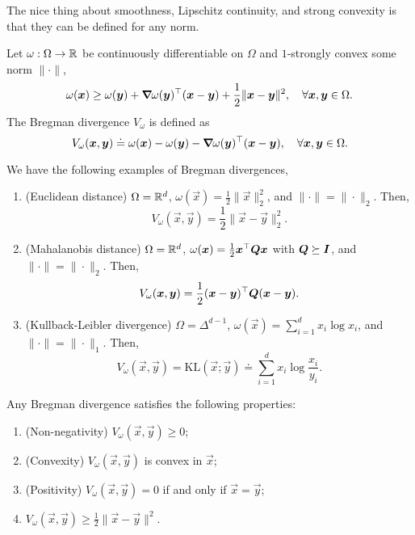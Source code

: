 The nice thing about smoothness, Lipschitz continuity, and strong convexity is that they can be
defined for any norm.

\begin{definition}
    Let $\omega: \Omega \to \mathbb{R}$ be continuously differentiable on $\Omega$ and $1$-strongly
    convex \wrt some norm $\| \cdot \|$, \[
        \omega(\bm{x}) \geq \omega(\bm{y}) + \bm{\nabla}_{\! } \omega(\bm{y})^\top(\bm{x} - \bm{y}) + \frac{1}{2} \| \bm{x} - \bm{y} \|^2, \quad \forall \bm{x},\bm{y} \in \Omega.
    \]
    The Bregman divergence $V_{\omega}$ is defined as \[
        V_{\omega}(\bm{x}, \bm{y}) \doteq \omega(\bm{x}) - \omega(\bm{y}) - \bm{\nabla}_{\! } \omega(\bm{y})^\top(\bm{x} - \bm{y}), \quad \forall \bm{x}, \bm{y} \in \Omega.
    \]
\end{definition}

\begin{example}
    \label{ex:bregman}
    We have the following examples of Bregman divergences,
    \begin{enumerate}
        \item \label{item:euc} (Euclidean distance) $\Omega = \mathbb{R}^d$, $\omega(\vec{x}) = \frac{1}{2} \| \vec{x} \|_2^2$, and $\|
                  \cdot \| = \| \cdot \|_2$. Then, \[
                  V_{\omega}(\vec{x}, \vec{y}) = \frac{1}{2} \| \vec{x} - \vec{y} \|_2^2.
              \]
        \item (Mahalanobis distance) $\Omega = \mathbb{R}^d$, $\omega(\bm{x}) = \frac{1}{2} \bm{x}^\top \bm{Q}
                  \bm{x}$ with $\bm{Q} \succeq \bm{I}$, and $\| \cdot \| = \| \cdot \|_2$. Then, \[
                  V_{\omega}(\bm{x}, \bm{y}) = \frac{1}{2} (\bm{x} - \bm{y})^\top \bm{Q} (\bm{x} - \bm{y}).
              \]
        \item \label{item:kl} (Kullback-Leibler divergence) $\Omega = \Delta^{d-1}$, $\omega(\vec{x}) = \sum_{i=1}^{d} x_i \log
                  x_i$, and $\| \cdot \| = \| \cdot \|_1$. Then, \[
                  V_{\omega}(\vec{x}, \vec{y}) = \mathrm{KL}(\vec{x}; \vec{y}) \doteq \sum_{i=1}^{d} x_i \log \frac{x_i}{y_i}.
              \]
    \end{enumerate}
\end{example}

\begin{lemma}
    Any Bregman divergence satisfies the following properties:
    \begin{enumerate}
        \item (Non-negativity) $V_{\omega}(\vec{x}, \vec{y}) \geq 0$;
        \item (Convexity) $V_{\omega}(\vec{x}, \vec{y})$ is convex in $\vec{x}$;
        \item (Positivity) $V_{\omega}(\vec{x}, \vec{y}) = 0$ if and only if $\vec{x} = \vec{y}$;
        \item $V_{\omega}(\vec{x}, \vec{y}) \geq \frac{1}{2} \| \vec{x} - \vec{y} \|^2$.
    \end{enumerate}
\end{lemma}

